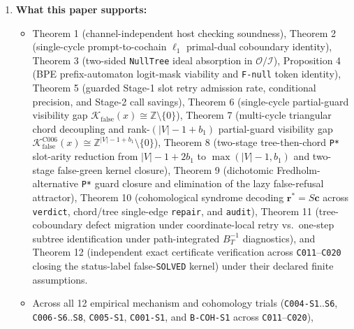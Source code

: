 \documentclass[
  11pt,
]{article}
\newcommand{\passthrough}[1]{#1}
\providecommand{\tightlist}{%
  \setlength{\itemsep}{0pt}\setlength{\parskip}{0pt}}
\begin{document}
\begin{enumerate}
\def\labelenumi{\arabic{enumi}.}
\tightlist
\item
  \textbf{What this paper supports:}

  \begin{itemize}
  \tightlist
  \item
    Theorem 1 (channel-independent host checking soundness), Theorem 2
    (single-cycle prompt-to-cochain \(\ell_1\) primal-dual coboundary
    identity), Theorem 3 (two-sided \passthrough{\lstinline!NullTree!}
    ideal absorption in \(\mathcal{O} / \mathcal{I}\)), Proposition 4
    (BPE prefix-automaton logit-mask viability and
    \passthrough{\lstinline!F-null!} token identity), Theorem 5 (guarded
    Stage-1 slot retry admission rate, conditional precision, and
    Stage-2 call savings), Theorem 6 (single-cycle partial-guard
    visibility gap
    \(\mathcal{K}_{\text{false}}(x) \cong \mathbb{Z} \setminus \{0\}\)),
    Theorem 7 (multi-cycle triangular chord decoupling and
    rank-\((|V|-1+b_1)\) partial-guard visibility gap
    \(\mathcal{K}_{\text{false}}^{\text{C006}}(x) \cong \mathbb{Z}^{|V|-1+b_1} \setminus \{0\}\)),
    Theorem 8 (two-stage tree-then-chord \passthrough{\lstinline!P*!}
    slot-arity reduction from \(|V|-1+2 b_1\) to
    \(\max(|V|-1,\allowbreak  b_1)\) and two-stage false-green kernel
    closure), Theorem 9 (dichotomic Fredholm-alternative
    \passthrough{\lstinline!P*!} guard closure and elimination of the
    lazy false-refusal attractor), Theorem 10 (cohomological syndrome
    decoding \(\mathbf{r}^* = S\mathbf{c}\) across
    \passthrough{\lstinline!verdict!}, chord/tree single-edge
    \passthrough{\lstinline!repair!}, and
    \passthrough{\lstinline!audit!}), Theorem 11 (tree-coboundary defect
    migration under coordinate-local retry vs.~one-step subtree
    identification under path-integrated \(B_T^{-1}\) diagnostics), and
    Theorem 12 (independent exact certificate verification across
    \passthrough{\lstinline!C011!}--\passthrough{\lstinline!C020!}
    closing the status-label false-\passthrough{\lstinline!SOLVED!}
    kernel) under their declared finite assumptions.
  \item
    Across all 12 empirical mechanism and cohomology trials
    (\passthrough{\lstinline!C004-S1!}..\passthrough{\lstinline!S6!},
    \passthrough{\lstinline!C006-S6!}..\passthrough{\lstinline!S8!},
    \passthrough{\lstinline!C005-S1!},
    \passthrough{\lstinline!C001-S1!}, and
    \passthrough{\lstinline!B-COH-S1!} across
    \passthrough{\lstinline!C011!}--\passthrough{\lstinline!C020!}),

\end{itemize}
\end{enumerate}
\end{document}
